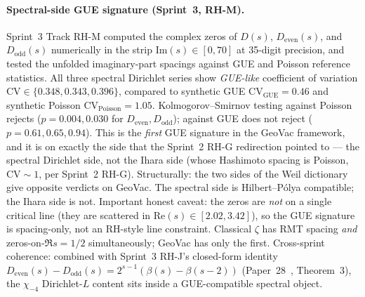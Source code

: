\documentclass[11pt]{article}
\begin{document}
\paragraph{Spectral-side GUE signature (Sprint~3, RH-M).}
Sprint~3 Track RH-M computed the complex zeros of $D(s)$,
$D_{\mathrm{even}}(s)$, and $D_{\mathrm{odd}}(s)$ numerically in the
strip $\mathrm{Im}(s) \in [0, 70]$ at 35-digit precision, and tested
the unfolded imaginary-part spacings against GUE and Poisson
reference statistics. All three spectral Dirichlet series show
\emph{GUE-like} coefficient of variation
$\mathrm{CV} \in \{0.348, 0.343, 0.396\}$, compared to synthetic GUE
$\mathrm{CV}_{\mathrm{GUE}} = 0.46$ and synthetic Poisson
$\mathrm{CV}_{\mathrm{Poisson}} = 1.05$. Kolmogorov--Smirnov testing
against Poisson rejects ($p = 0.004, 0.030$ for $D_{\mathrm{even}},
D_{\mathrm{odd}}$); against GUE does not reject ($p = 0.61, 0.65, 0.94$).
This is the \emph{first} GUE signature in the GeoVac framework, and
it is on exactly the side that the Sprint~2 RH-G redirection pointed
to --- the spectral Dirichlet side, not the Ihara side (whose
Hashimoto spacing is Poisson, $\mathrm{CV} \sim 1$, per Sprint~2
RH-G). Structurally: the two sides of the Weil dictionary give
opposite verdicts on GeoVac. The spectral side is Hilbert--P\'olya
compatible; the Ihara side is not. Important honest caveat: the zeros
are \emph{not} on a single critical line (they are scattered in
$\mathrm{Re}(s) \in [2.02, 3.42]$), so the GUE signature is spacing-only,
not an RH-style line constraint. Classical $\zeta$ has RMT spacing
\emph{and} zeros-on-$\Re s = 1/2$ simultaneously; GeoVac has only the
first.  Cross-sprint
coherence: combined with Sprint~3 RH-J's closed-form identity
$D_{\mathrm{even}}(s) - D_{\mathrm{odd}}(s) = 2^{s-1}(\beta(s) - \beta(s-2))$
(Paper~28~\cite{paper28}, Theorem~3), the $\chi_{-4}$
Dirichlet-$L$ content sits inside a GUE-compatible spectral object.
\end{document}
